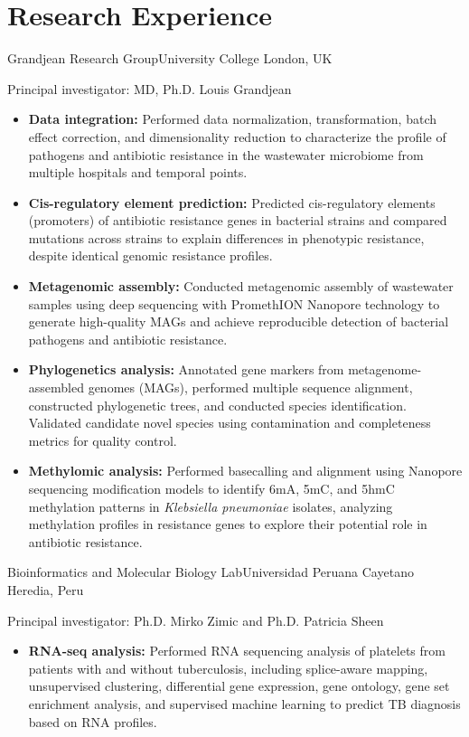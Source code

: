 \documentclass[11pt,a4paper,sans]{moderncv}
\begin{document}
\section{Research Experience}
  {Grandjean Research Group}{University College London, UK}{}
  {Principal investigator: MD, Ph.D. Louis Grandjean
  \begin{itemize}%
    \item \textbf{Data integration:} {\footnotesize Performed data normalization, transformation, batch effect correction, and dimensionality reduction to characterize the profile of pathogens and antibiotic resistance in the wastewater microbiome from multiple hospitals and temporal points.}
    \item \textbf{Cis-regulatory element prediction:} {\footnotesize Predicted cis-regulatory elements (promoters) of antibiotic resistance genes in bacterial strains and compared mutations across strains to explain differences in phenotypic resistance, despite identical genomic resistance profiles.}
    \item \textbf{Metagenomic assembly:} {\footnotesize Conducted metagenomic assembly of wastewater samples using deep sequencing with PromethION Nanopore technology to generate high-quality MAGs and achieve reproducible detection of bacterial pathogens and antibiotic resistance.}
    \item \textbf{Phylogenetics analysis:} {\footnotesize Annotated gene markers from metagenome-assembled genomes (MAGs), performed multiple sequence alignment, constructed phylogenetic trees, and conducted species identification. Validated candidate novel species using contamination and completeness metrics for quality control.}
    \item \textbf{Methylomic analysis:} {\footnotesize Performed basecalling and alignment using Nanopore sequencing modification models to identify 6mA, 5mC, and 5hmC methylation patterns in \textit{Klebsiella pneumoniae} isolates, analyzing methylation profiles in resistance genes to explore their potential role in antibiotic resistance.}
  \end{itemize}
  }

  {Bioinformatics and Molecular Biology Lab}{Universidad Peruana Cayetano Heredia, Peru}
  {}
  {Principal investigator: Ph.D. Mirko Zimic and  Ph.D. Patricia Sheen%
  \begin{itemize}%
    \item \textbf{RNA-seq analysis:} {\footnotesize Performed RNA sequencing analysis of platelets from patients with and without tuberculosis, including splice-aware mapping, unsupervised clustering, differential gene expression, gene ontology, gene set enrichment analysis, and supervised machine learning to predict TB diagnosis based on RNA profiles.}
  \end{itemize}
  }
\end{document}
